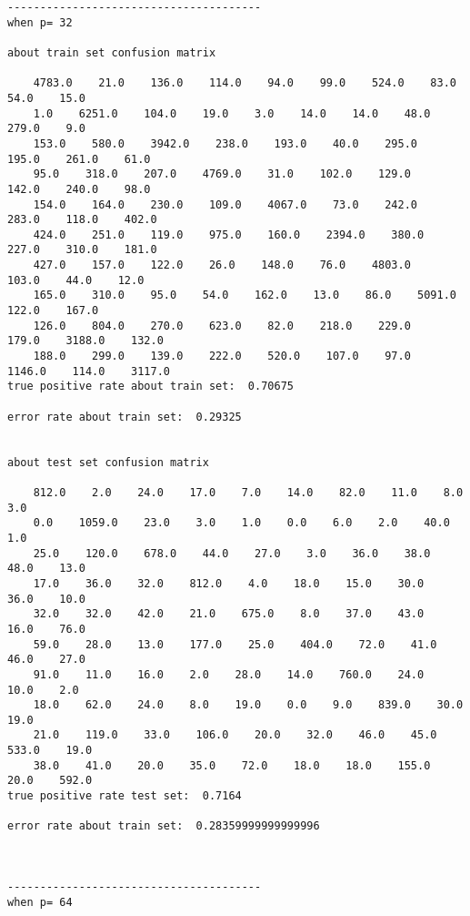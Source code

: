 \documentclass[11pt]{article}
\begin{document}
    \begin{Verbatim}[commandchars=\\\{\}]



---------------------------------------
when p= 32

about train set confusion matrix

    4783.0    21.0    136.0    114.0    94.0    99.0    524.0    83.0    54.0    15.0
    1.0    6251.0    104.0    19.0    3.0    14.0    14.0    48.0    279.0    9.0
    153.0    580.0    3942.0    238.0    193.0    40.0    295.0    195.0    261.0    61.0
    95.0    318.0    207.0    4769.0    31.0    102.0    129.0    142.0    240.0    98.0
    154.0    164.0    230.0    109.0    4067.0    73.0    242.0    283.0    118.0    402.0
    424.0    251.0    119.0    975.0    160.0    2394.0    380.0    227.0    310.0    181.0
    427.0    157.0    122.0    26.0    148.0    76.0    4803.0    103.0    44.0    12.0
    165.0    310.0    95.0    54.0    162.0    13.0    86.0    5091.0    122.0    167.0
    126.0    804.0    270.0    623.0    82.0    218.0    229.0    179.0    3188.0    132.0
    188.0    299.0    139.0    222.0    520.0    107.0    97.0    1146.0    114.0    3117.0
true positive rate about train set:  0.70675

error rate about train set:  0.29325


about test set confusion matrix

    812.0    2.0    24.0    17.0    7.0    14.0    82.0    11.0    8.0    3.0
    0.0    1059.0    23.0    3.0    1.0    0.0    6.0    2.0    40.0    1.0
    25.0    120.0    678.0    44.0    27.0    3.0    36.0    38.0    48.0    13.0
    17.0    36.0    32.0    812.0    4.0    18.0    15.0    30.0    36.0    10.0
    32.0    32.0    42.0    21.0    675.0    8.0    37.0    43.0    16.0    76.0
    59.0    28.0    13.0    177.0    25.0    404.0    72.0    41.0    46.0    27.0
    91.0    11.0    16.0    2.0    28.0    14.0    760.0    24.0    10.0    2.0
    18.0    62.0    24.0    8.0    19.0    0.0    9.0    839.0    30.0    19.0
    21.0    119.0    33.0    106.0    20.0    32.0    46.0    45.0    533.0    19.0
    38.0    41.0    20.0    35.0    72.0    18.0    18.0    155.0    20.0    592.0
true positive rate test set:  0.7164

error rate about train set:  0.28359999999999996



---------------------------------------
when p= 64


\end{Verbatim}
\end{document}
